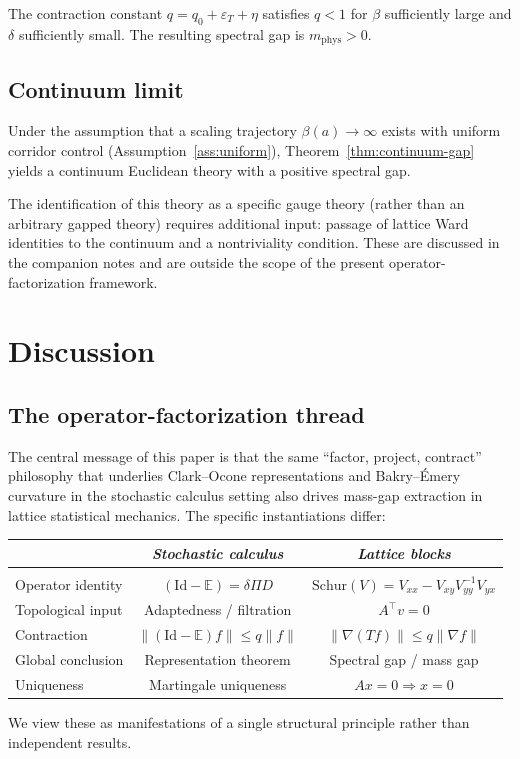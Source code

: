 \documentclass[11pt]{article}
\theoremstyle{definition}
\newcommand{\E}{\mathbb{E}}
\newcommand{\1}{\mathbf{1}}
\newcommand{\norm}[1]{\lVert #1\rVert}
\begin{document}
The contraction constant $q=q_0+\varepsilon_T+\eta$ satisfies $q<1$ for $\beta$
sufficiently large and $\delta$ sufficiently small.  The resulting spectral gap is
$m_{\mathrm{phys}}>0$.

\subsection{Continuum limit}

Under the assumption that a scaling trajectory $\beta(a)\to\infty$ exists with uniform
corridor control (Assumption~\ref{ass:uniform}), Theorem~\ref{thm:continuum-gap} yields
a continuum Euclidean theory with a positive spectral gap.

The identification of this theory as a specific gauge theory (rather than an arbitrary
gapped theory) requires additional input: passage of lattice Ward identities to the
continuum and a nontriviality condition.  These are discussed in the companion notes
\cite{Fontes2026Ward,Fontes2026Loop} and are outside the scope of the present
operator-factorization framework.

\section{Discussion}\label{sec:discussion}

\subsection{The operator-factorization thread}

The central message of this paper is that the same ``factor, project, contract'' philosophy
that underlies Clark--Ocone representations and Bakry--\'Emery curvature in the stochastic
calculus setting also drives mass-gap extraction in lattice statistical mechanics.  The
specific instantiations differ:
\begin{center}
\begin{tabular}{lcc}
& \emph{Stochastic calculus} & \emph{Lattice blocks}\\[3pt]
\hline\\[-6pt]
Operator identity & $(\mathrm{Id}-\E)=\delta\Pi D$ & $\mathrm{Schur}(V)=V_{xx}-V_{xy}V_{yy}^{-1}V_{yx}$\\[2pt]
Topological input & Adaptedness / filtration & $A^\top v=0$\\[2pt]
Contraction & $\norm{(\mathrm{Id}-\E)f}\le q\norm{f}$ & $\norm{\nabla(Tf)}\le q\norm{\nabla f}$\\[2pt]
Global conclusion & Representation theorem & Spectral gap / mass gap\\[2pt]
Uniqueness & Martingale uniqueness & $Ax=0\Rightarrow x=0$
\end{tabular}
\end{center}
We view these as manifestations of a single structural principle rather than independent results.
\end{document}
